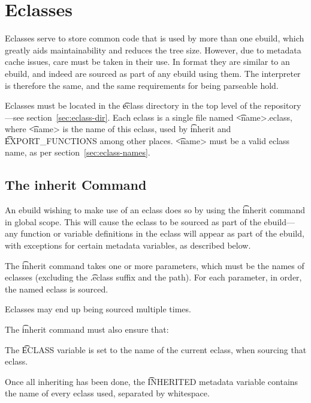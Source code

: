 \chapter{Eclasses}
\label{ch:eclasses}

Eclasses serve to store common code that is used by more than one ebuild, which greatly aids
maintainability and reduces the tree size. However, due to metadata cache issues, care must be taken
in their use. In format they are similar to an ebuild, and indeed are sourced as part of any ebuild
using them. The interpreter is therefore the same, and the same requirements for being parseable
hold.

Eclasses must be located in the \t{eclass} directory in the top level of the repository---see
section~\ref{sec:eclass-dir}. Each eclass is a single file named \t{<name>.eclass}, where \t{<name>}
is the name of this eclass, used by \t{inherit} and \t{EXPORT_FUNCTIONS} among other places.
\t{<name>} must be a valid eclass name, as per section~\ref{sec:eclass-names}.

\section{The inherit Command}
\label{sec:inherit}

An ebuild wishing to make use of an eclass does so by using the \t{inherit} command in global scope.
This will cause the eclass to be sourced as part of the ebuild---any function or variable
definitions in the eclass will appear as part of the ebuild, with exceptions for certain metadata
variables, as described below.

The \t{inherit} command takes one or more parameters, which must be the names of eclasses (excluding
the \t{.eclass} suffix and the path). For each parameter, in order, the named eclass is sourced.

Eclasses may end up being sourced multiple times.

The \t{inherit} command must also ensure that:

\begin{compactitem}
\item The \t{ECLASS} variable is set to the name of the current eclass, when sourcing that eclass.
\item Once all inheriting has been done, the \t{INHERITED} metadata variable contains the name of
    every eclass used, separated by whitespace.
\end{compactitem}

